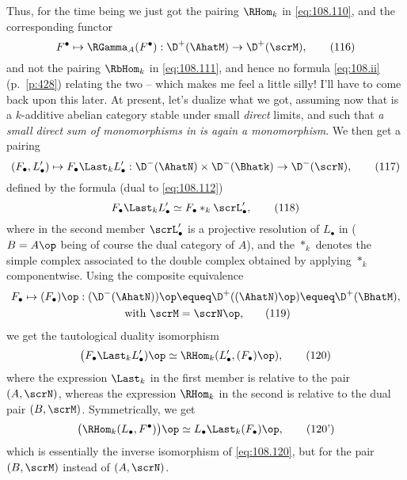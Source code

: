 Thus, for the time being we just got the pairing $\RHom_k$ in
\eqref{eq:108.110}, and the corresponding functor
\begin{equation}
  \label{eq:108.116}
  F^\bullet\mapsto \RGamma_A(F^\bullet) : \D^+(\AhatM) \to \D^+(\scrM),\tag{116}
\end{equation}
and not the pairing $\RbHom_k$ in \eqref{eq:108.111}, and
hence no formula \eqref{eq:108.ii} (p.\ \ref{p:428}) relating the two
-- which makes me feel a little silly! I'll have to come back upon
this later. At present, let's dualize what we got, assuming now that
\scrN{} is a $k$-additive abelian category stable under small
\emph{direct} limits, and such that \emph{a small direct sum of
  monomorphisms in \scrN{} is again a monomorphism}. We then get a
pairing
\begin{equation}
  \label{eq:108.117}
  (F_\bullet,L'_\bullet) \mapsto F_\bullet \Last_k L'_\bullet :
  \D^-(\AhatN)\times\D^-(\Bhatk) \to \D^-(\scrN),\tag{117}
\end{equation}
defined by the formula (dual to \eqref{eq:108.112})
\begin{equation}
  \label{eq:108.118}
  F_\bullet \Last_k L'_\bullet \simeq F_\bullet *_k \scrL'_\bullet,\tag{118}
\end{equation}
where in the second member $\scrL'_\bullet$ is a projective resolution
of $L_\bullet$ in \Bhatk{} ($B=A\op$ being of course the dual category
of $A$), and the $*_k$ denotes the simple complex associated to the
double complex obtained by applying $*_k$ componentwise. Using the
composite equivalence
\begin{multline}
  \label{eq:108.119}
  F_\bullet\mapsto(F_\bullet)\op: (\D^-(\AhatN))\op\equeq
  \D^+((\AhatN)\op)\equeq \D^+(\BhatM),\\
  \text{ with $\scrM=\scrN\op$,}\tag{119}
\end{multline}
we get the tautological duality isomorphism
\begin{equation}
  \label{eq:108.120}
  \bigl(F_\bullet\Last_k L'_\bullet)\op \simeq \RHom_k(L'_\bullet,
  (F_\bullet)\op),\tag{120} 
\end{equation}
where the expression $\Last_k$ in the first member is relative to the
pair $(A,\scrN)$, whereas the expression $\RHom_k$ in the second is
relative to the dual pair $(B,\scrM)$. Symmetrically, we get
\begin{equation}
  \label{eq:108.120prime}
  \bigl(\RHom_k(L_\bullet,F^\bullet)\bigr)\op \simeq L_\bullet \Last_k
  (F_\bullet)\op,\tag{120'} 
\end{equation}
which is essentially the inverse isomorphism of \eqref{eq:108.120},
but for the pair $(B,\scrM)$ instead of $(A,\scrN)$.

